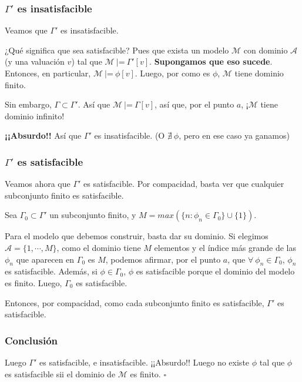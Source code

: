 \documentclass{beamer}
\begin{document}
\begin{frame}
\frametitle{$\Gamma'$ es \textbf{in}satisfacible}

Veamos que $\Gamma'$ es insatisfacible.

¿Qué significa que sea satisfacible? Pues que exista un modelo $\mathcal{M}$ con dominio $\mathcal{A}$ (y una valuación $v$) tal que $\mathcal{M}\ |$=$\ \Gamma'[v]$. \textbf{Supongamos que eso sucede}. Entonces, en particular, $\mathcal{M}\ |$=$\ \phi[v]$. Luego, por como es $\phi$, $\mathcal{M}$ tiene dominio finito.

\pause

\bigskip

Sin embargo, $\Gamma \subset \Gamma'$. Así que $\mathcal{M}\ |$=$\ \Gamma[v]$, así que, por el punto $a$, ¡$\mathcal{M}$ tiene dominio infinito!

\textbf{¡¡Absurdo!!} Así que $\Gamma'$ es insatisfacible. (O $\nexists\ \phi$, pero en ese caso ya ganamos)

\end{frame}


\begin{frame}
\frametitle{$\Gamma'$ es satisfacible}

Veamos ahora que $\Gamma'$ es satisfacible.
Por compacidad, basta ver que cualquier subconjunto finito es satisfacible.

\pause

\bigskip


Sea $\Gamma_{0} \subset \Gamma'$ un subconjunto finito, y
		$M = max (\{n: \phi_n \in \Gamma_0\}\cup \{1\})$.
		
		\pause 
		
		\bigskip
		
		Para el modelo que debemos construir, basta dar su dominio. Si elegimos $\mathcal{A} = \{1, \cdots, M\}$, como el dominio tiene $M$ elementos y el índice más grande de las $\phi_n$ que aparecen en $\Gamma_0$	es $M$, podemos afirmar, por el punto $a$, que $\forall\ \phi_n \in \Gamma_0$, $\phi_n$ es satisfacible. Además, si $\phi \in \Gamma_0$, $\phi$ es satisfacible porque el dominio del modelo es finito. Luego, $\Gamma_0$ es satisfacible.
		
				\pause \bigskip

		
		Entonces, por compacidad, como cada subconjunto finito es satisfacible, $\Gamma'$ es satisfacible.
		
\end{frame}

\begin{frame}
\frametitle{Conclusión}

Luego $\Gamma'$ es satisfacible, e insatisfacible. ¡¡Absurdo!! Luego no existe $\phi$ tal que $\phi$ es satisfacible sii el dominio de $\mathcal{M}$ es finito. $\square$


\end{frame}
\end{document}

